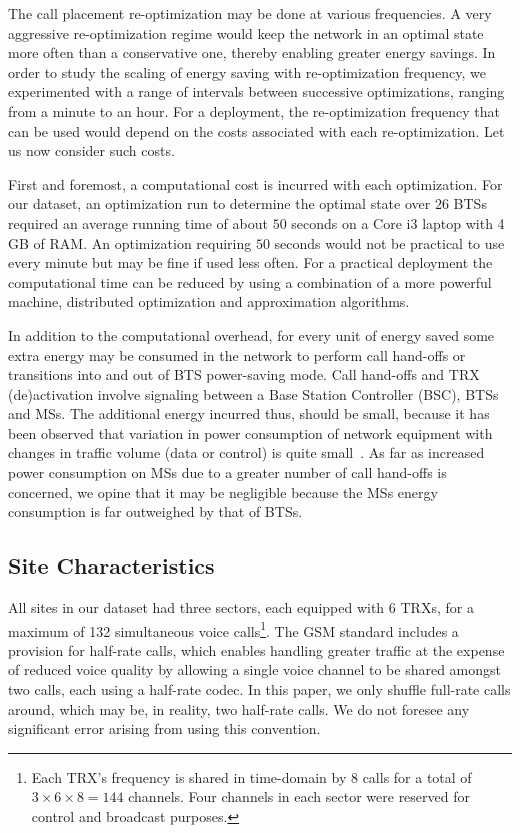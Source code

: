 The call placement re-optimization may be done at various frequencies. A very aggressive re-optimization regime would keep the network in an optimal state more often than a conservative one, thereby enabling greater energy savings. In order to study the scaling of energy saving with re-optimization frequency, we experimented with a range of intervals between successive optimizations, ranging from a minute to an hour. For a deployment, the re-optimization frequency that can be used would depend on the costs associated with each re-optimization. Let us now consider such costs.

First and foremost, a computational cost is incurred with each optimization. For our dataset, an optimization run to determine the optimal state over $26$ BTSs required an average running time of about $50$ seconds on a Core i3 laptop with 4 GB of RAM. An optimization requiring $50$ seconds would not be practical to use every minute but may be fine if used less often. For a practical deployment the computational time can be reduced by using a combination of a more powerful machine, distributed optimization and approximation algorithms. 

In addition to the computational overhead, for every unit of energy saved some extra energy may be consumed in the network to perform call hand-offs or transitions into and out of BTS power-saving mode. Call hand-offs and TRX (de)activation involve signaling between a Base Station Controller (BSC), BTSs and MSs. The additional energy incurred thus, should be small, because it has been observed that variation in power consumption of network equipment with changes in traffic volume (data or control) is quite small~\cite{Chabarek08powerawareness}. As far as increased power consumption on MSs due to a greater number of call hand-offs is concerned, we opine that it may be negligible because the MSs energy consumption is far outweighed by that of BTSs.

\subsection{Site Characteristics}
\label{subsec:case2:experiments:sitetypes} All sites in our dataset had three sectors, each equipped with 6 TRXs, for a maximum of 132 simultaneous voice calls\footnote[1]{Each TRX's frequency is shared in time-domain  by 8 calls for  a total of $3\times6\times8=144$ channels. Four channels in each sector were reserved for control and broadcast purposes.}. The GSM standard includes a provision for half-rate calls, which enables handling greater traffic at the expense of reduced voice quality by allowing a single voice channel to be shared amongst two calls, each using a half-rate codec. In this paper, we only shuffle full-rate calls around, which may be, in reality, two half-rate calls. We do not foresee any significant error arising from using this convention.

